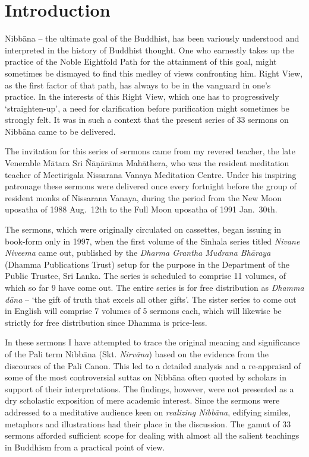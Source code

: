 \chapter{Introduction}

Nibbāna -- the ultimate goal of the Buddhist, has been variously understood and interpreted in the history of Buddhist thought. One who earnestly takes up the practice of the Noble Eightfold Path for the attainment of this goal, might sometimes be dismayed to find this medley of views confronting him. Right View, as the first factor of that path, has always to be in the vanguard in one's practice. In the interests of this Right View, which one has to progressively `straighten-up', a need for clarification before purification might sometimes be strongly felt. It was in such a context that the present series of 33 sermons on Nibbāna came to be delivered.

The invitation for this series of sermons came from my revered teacher, the late Venerable Mātara Sri Ñāṇārāma Mahāthera, who was the resident meditation teacher of Meetirigala Nissarana Vanaya Meditation Centre. Under his inspiring patronage these sermons were delivered once every fortnight before the group of resident monks of Nissarana Vanaya, during the period from the New Moon uposatha of 1988 Aug.~12th to the Full Moon uposatha of 1991 Jan.~30th.

The sermons, which were originally circulated on cassettes, began issuing in book-form only in 1997, when the first volume of the Sinhala series titled \emph{Nivane Niveema} came out, published by the \emph{Dharma Grantha Mudrana Bhāraya} (Dhamma Publications Trust) setup for the purpose in the Department of the Public Trustee, Sri Lanka. The series is scheduled to comprise 11 volumes, of which so far 9 have come out. The entire series is for free distribution as \emph{Dhamma dāna} -- `the gift of truth that excels all other gifts'. The sister series to come out in English will comprise 7 volumes of 5 sermons each, which will likewise be strictly for free distribution since Dhamma is price-less.

In these sermons I have attempted to trace the original meaning and significance of the Pali term Nibbāna (Skt. \emph{Nirvāna}) based on the evidence from the discourses of the Pali Canon. This led to a detailed analysis and a re-appraisal of some of the most controversial suttas on Nibbāna often quoted by scholars in support of their interpretations. The findings, however, were not presented as a dry scholastic exposition of mere academic interest. Since the sermons were addressed to a meditative audience keen on \emph{realizing Nibbāna}, edifying similes, metaphors and illustrations had their place in the discussion. The gamut of 33 sermons afforded sufficient scope for dealing with almost all the salient teachings in Buddhism from a practical point of view.

